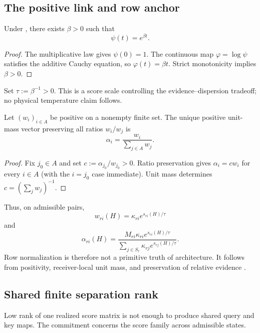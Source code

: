 \subsection{The positive link and row anchor}

\begin{lemma}\label{lem:exponential-link}
Under , there exists $\beta>0$ such that
\[
\psi(t)=e^{\beta t}.
\]
\end{lemma}

\begin{proof}
The multiplicative law gives $\psi(0)=1$. The continuous map $\varphi=\log\psi$ satisfies the additive Cauchy equation, so $\varphi(t)=\beta t$. Strict monotonicity implies $\beta>0$.
\end{proof}

Set $\tau:=\beta^{-1}>0$. This is a score scale controlling the evidence--dispersion tradeoff; no physical temperature claim follows.

\begin{lemma}\label{lem:row-anchor}
Let $(w_i)_{i\in A}$ be positive on a nonempty finite set. The unique positive unit-mass vector preserving all ratios $w_i/w_j$ is
\[
\alpha_i=\frac{w_i}{\sum_{j\in A}w_j}.
\]
\end{lemma}

\begin{proof}
Fix $j_0\in A$ and set $c:=\alpha_{j_0}/w_{j_0}>0$. Ratio preservation gives $\alpha_i=cw_i$ for every $i\in A$ (with the $i=j_0$ case immediate). Unit mass determines $c=(\sum_jw_j)^{-1}$.
\end{proof}

Thus, on admissible pairs,
\[
w_{ri}(H)=\kappa_{ri}e^{s_{ri}(H)/\tau}
\]
and
\begin{equation}\label{eq:general-softmax-row}
\alpha_{ri}(H)
=
\frac{M_{ri}\kappa_{ri}e^{s_{ri}(H)/\tau}}
{\sum_{j\in S_r}\kappa_{rj}e^{s_{rj}(H)/\tau}}.
\end{equation}
Row normalization is therefore not a primitive truth of architecture. It follows from positivity, receiver-local unit mass, and preservation of relative evidence \citep{luce1959individual}.

\subsection{Shared finite separation rank}

Low rank of one realized score matrix is not enough to produce shared query and key maps. The commitment concerns the score family across admissible states.

